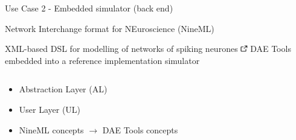 \documentclass[compress,newPxFont,sthlmFooter]{beamer}
\begin{document}
\begin{frame}[plain]{Use Case 2 - Embedded simulator (back end)}
    \begin{center}
        \alert{Network Interchange format for NEuroscience (NineML)}
    \end{center}   
    \small{XML-based DSL for modelling of networks of spiking neurones 
                \href{http://software.incf.org/software/nineml}{\includegraphics[align=b, height=0.8em]{link.png}}
                } \linebreak
    \small{DAE Tools embedded into a \alert{reference implementation simulator}}
    \begin{columns}[c]
      \begin{column}{0.50\paperwidth}
        {\scriptsize
         \begin{itemize}
            \item \alert{Abstraction Layer (AL)}
            \item \alert{User Layer (UL)}
            \item NineML concepts $\rightarrow$ DAE Tools concepts
        \end{itemize}
        }
      \end{column}
      

\end{columns}
\end{frame}
\end{document}
